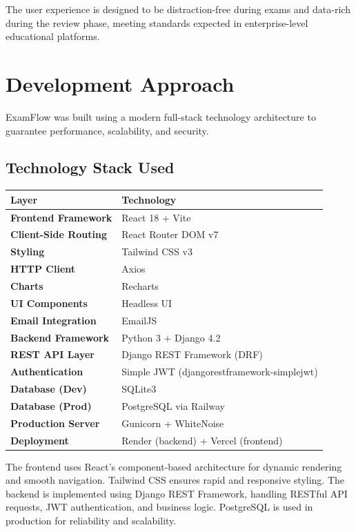 \documentclass[12pt,a4paper]{article}
\begin{document}
\begin{notebox}
The user experience is designed to be distraction-free during exams and data-rich during the review phase, meeting standards expected in enterprise-level educational platforms.
\end{notebox}

\section{Development Approach}

ExamFlow was built using a modern full-stack technology architecture to guarantee performance, scalability, and security.

\subsection{Technology Stack Used}

\begin{center}
\begin{tabular}{>{\bfseries}l l}
  \toprule
  Layer & Technology \\
  \midrule
  Frontend Framework  & React 18 + Vite \\
  Client-Side Routing & React Router DOM v7 \\
  Styling             & Tailwind CSS v3 \\
  HTTP Client         & Axios \\
  Charts              & Recharts \\
  UI Components       & Headless UI \\
  Email Integration   & EmailJS \\
  Backend Framework   & Python 3 + Django 4.2 \\
  REST API Layer      & Django REST Framework (DRF) \\
  Authentication      & Simple JWT (djangorestframework-simplejwt) \\
  Database (Dev)      & SQLite3 \\
  Database (Prod)     & PostgreSQL via Railway \\
  Production Server   & Gunicorn + WhiteNoise \\
  Deployment          & Render (backend) + Vercel (frontend) \\
  \bottomrule
\end{tabular}
\end{center}

\vspace{0.5em}
The frontend uses React's component-based architecture for dynamic rendering and smooth navigation. Tailwind CSS ensures rapid and responsive styling. The backend is implemented using Django REST Framework, handling RESTful API requests, JWT authentication, and business logic. PostgreSQL is used in production for reliability and scalability.
\end{document}
